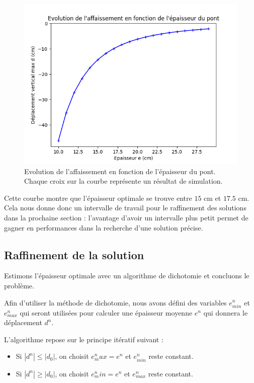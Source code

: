 \documentclass{article}
\begin{document}
    \begin{figure}
    \begin{center}
	
        \includegraphics[width=12cm]{imgs/ed.png}
        \caption{Evolution de l'affaissement en fonction de l'épaisseur du pont. Chaque croix sur la courbe représente un résultat de simulation.}
        \label{fig:graph}
    
	\end{center}
    \end{figure}
    
    Cette courbe montre que l'épaisseur optimale se trouve entre $15$ cm et $17.5$ cm. 
    Cela nous donne donc un intervalle de travail pour le raffinement des solutions dans la prochaine section :
    l'avantage d'avoir un intervalle plus petit permet de gagner en performances dans la recherche d'une solution précise.

    \subsection{Raffinement de la solution}

    \begin{problem}{6}
        Estimons l'épaisseur optimale avec un algorithme de dichotomie et concluons le problème.
    \end{problem}
    
    Afin d'utiliser la méthode de dichotomie, 
    nous avons défini des variables $e^n_{min}$ et $e^n_{max}$  qui seront utilisées pour calculer une épaisseur moyenne $e^n$ 	
    qui donnera le déplacement $d^n$. 
    
    L'algorithme repose sur le principe itératif suivant :    
    \begin{itemize}
    \item Si $|d^n| \le |d_0|$, on choisit $e^n_max = e^n$ et $e^n_{min}$ reste constant.
    \item Si $|d^n| \ge |d_0|$, on choisit $e^n_min = e^n$ et $e^n_{max}$ reste constant.
    \end{itemize}
   
\end{document}
